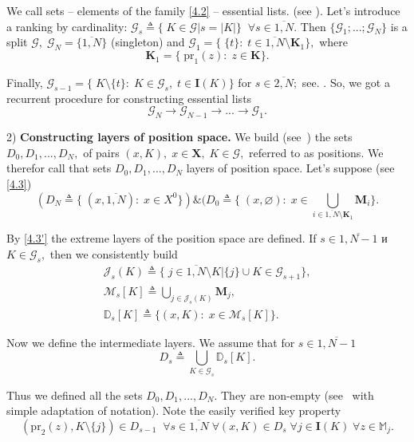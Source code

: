 \documentclass[10pt]{article}
\begin{document}
We call
sets -- elements of the family \eqref {4.2} --
essential lists.
(see \cite[$\S 4.9$]{14}).
Let's introduce a ranking by cardinality:
$\mathcal{G}_s {\triangleq} \{\;K \in \mathcal{G} \vert s = |K|\}\;\;\forall{s} \in \overline{1,N}.$
Then
$\{\mathcal{G}_1;...;\mathcal{G}_N\}$
is a split
$\mathcal{G},\;\mathcal{G}_N = \{\overline{1,N}\}$
(singleton)
and
$\mathcal{G}_1 = \{\;\{t\}:\;t \in \overline{1,N} \setminus \mathbf{K}_1\},$
where
\begin{equation}\label{4.3}
  \mathbf{K}_1 = \{\;\mathrm{pr}_1(z):\;z \in \mathbf{K}\}.
\end{equation}

Finally,
$\mathcal{G}_{s-1} = \{\;K \setminus\{t\}:\;K \in \mathcal{G}_s,\;t \in \mathbf{I}(K)\}$
for $s \in \overline{2,N};$
see. \cite[$\S$3.5]{4}.
So, we got a recurrent procedure for constructing essential lists
$$
  \mathcal{G}_N \longrightarrow \mathcal{G}_{N-1} \longrightarrow ... \longrightarrow \mathcal{G}_1.
$$

2) {\bf Constructing layers of position space.}
We build
(see~\cite[$\S$4.9]{14})
the sets $D_0,D_1,...,D_N,$
of pairs
$(x,K),\;x \in \mathbf{X},\;K \in \mathcal{G},$
referred to as positions.
We therefor call that sets
$D_0, D_1, \dots, D_N$
layers of position space.
Let's suppose
(see \eqref{4.3})
\begin{equation}\label{4.3'}
  (D_N {\triangleq} \{\;(x,\overline{1,N}):\;x \in X^0\}) \&
  (D_0 {\triangleq} \{\;(x,\varnothing):\;x \in
    \bigcup\limits_{i \in \overline{1,N} \setminus \mathbf{K}_1} \mathbf{\mathbf{M}}_i\}.
\end{equation}

By
\eqref{4.3'}
the extreme layers of the position space are defined.
If
$s \in \overline{1,N-1}$ и $K \in \mathcal{G}_s,$
then we consistently build
\begin{multline*}
  \mathcal{J}_s(K) {\triangleq}
  \{\;j \in \overline{1,N} \setminus K \vert \{j\} \cup K
  \in \mathcal{G}_{s+1}\},
  \\
  \mathcal{M}_s[K] {\triangleq}
  \bigcup\limits_{j \in \mathcal{J}_s(K)} \mathbf{M}_j,
  \\
  \mathbb{D}_s[K] {\triangleq}
  \{(x,K):\;x \in \mathcal{M}_s[K]\}.
\end{multline*}

Now we define the intermediate layers.
We assume that for
$s \in \overline{1,N - 1}$
$$
  D_s {\triangleq} \bigcup\limits_{K \in \mathcal{G}_s} \mathbb{D}_s[K].
$$

Thus we defined all the sets
$D_0,D_1,...,D_N$.
They are non-empty
(see~\cite[prop.~4.9.3]{14}
with simple adaptation of notation).
Note the easily verified key property
\begin{equation}\label{4.4}
  (\mathrm{pr}_2(z),K \setminus \{j\}) \in D_{s-1}\;\;
  \forall{s} \in \overline{1,N}\;\forall{(x,K)} \in D_s\;
  \forall{j} \in \mathbf{I}(K)\;\forall{z} \in \mathbb{M}_j.
\end{equation}
\end{document}
